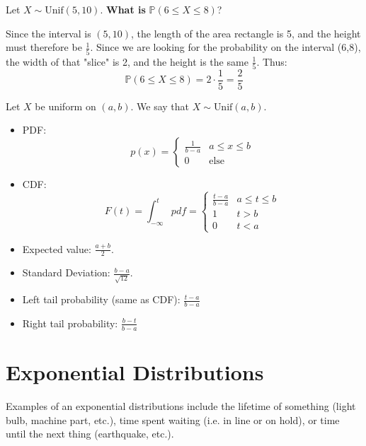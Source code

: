 \documentclass[titlepage, 12pt, leqno]{article}
\begin{document}
\begin{ex} 
    Let $X \sim \text{Unif}(5,10)$. \textbf{What is} $\mathbb{P}(6 \le X \le 8)$?
    \vspace{10px}
    
    Since the interval is $(5,10)$, the length of the area rectangle is 5, and the
    height must therefore be $\frac{1}{5}$. Since we are looking for the 
    probability on the interval (6,8), the width of that "slice" is 2, and the 
    height is the same $\frac{1}{5}$. Thus:
    \[
        \boxed{\mathbb{P}(6 \le X \le 8) = 2 \cdot \frac{1}{5} = \frac{2}{5}} 
    \]
\end{ex}

Let $X$ be uniform on $(a,b)$. We say that $X \sim \text{Unif}(a,b)$.
\begin{itemize}
    \item PDF:
        \[
            p(x) = 
            \begin{cases}
                \frac{1}{b-a} & a \le x \le b\\
                0 & \text{else}
            \end{cases}
        \]
   \item CDF:
       \[
           F(t) = \int_{-\infty}^{t}pdf =
           \begin{cases}
               \frac{t-a}{b-a} & a \le t \le b \\
               1 & t > b \\
               0 & t < a
           \end{cases}
           \]
    \item Expected value: $\frac{a+b}{2}$.
    \item Standard Deviation: $\frac{b-a}{\sqrt{12}}$.
    \item Left tail probability (same as CDF): $\frac{t-a}{b-a}$
    \item Right tail probability: $\frac{b-t}{b-a}$
\end{itemize}

\pagebreak
\section{Exponential Distributions}
Examples of an exponential distributions include the lifetime of something (light
bulb, machine part, etc.), time spent waiting (i.e. in line or on hold), or time
until the next thing (earthquake, etc.).
\end{document}
